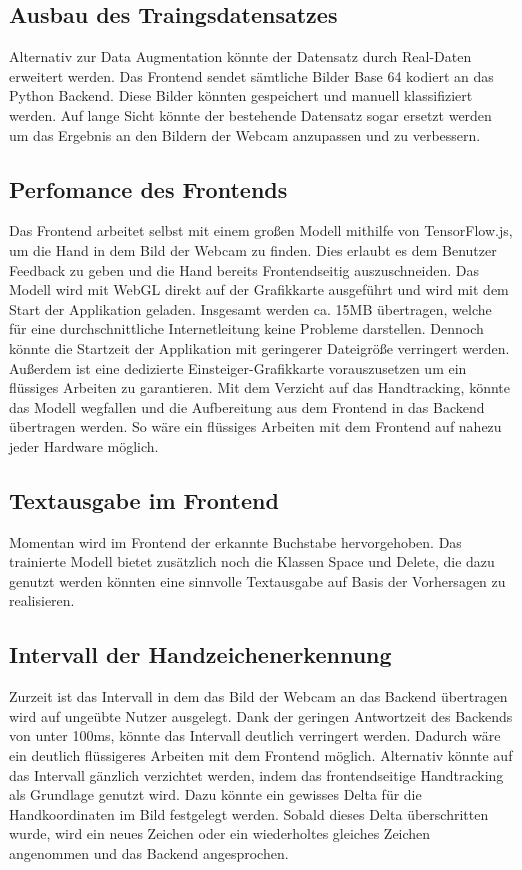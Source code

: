 \documentclass[11pt,bibliography=totocnumbered]{scrartcl}
\begin{document}
\subsection{Ausbau des Traingsdatensatzes}
Alternativ zur Data Augmentation könnte der Datensatz durch Real-Daten erweitert werden. Das Frontend sendet sämtliche Bilder Base 64 kodiert an das Python Backend. Diese Bilder könnten gespeichert und manuell klassifiziert werden. Auf lange Sicht könnte der bestehende Datensatz sogar ersetzt werden um das Ergebnis an den Bildern der Webcam anzupassen und zu verbessern.
\subsection{Perfomance des Frontends}
Das Frontend arbeitet selbst mit einem großen Modell mithilfe von TensorFlow.js, um die Hand in dem Bild der Webcam zu finden. Dies erlaubt es dem Benutzer Feedback zu geben und die Hand bereits Frontendseitig auszuschneiden. Das Modell wird mit WebGL direkt auf der Grafikkarte ausgeführt und wird mit dem Start der Applikation geladen. Insgesamt werden ca. 15MB übertragen, welche für eine durchschnittliche Internetleitung keine Probleme darstellen. Dennoch könnte die Startzeit der Applikation mit geringerer Dateigröße verringert werden. Außerdem ist eine dedizierte Einsteiger-Grafikkarte vorauszusetzen um ein flüssiges Arbeiten zu garantieren. Mit dem Verzicht auf das Handtracking, könnte das Modell wegfallen und die Aufbereitung aus dem Frontend in das Backend übertragen werden. So wäre ein flüssiges Arbeiten mit dem Frontend auf nahezu jeder Hardware möglich.
\subsection{Textausgabe im Frontend}
Momentan wird im Frontend der erkannte Buchstabe hervorgehoben. Das trainierte Modell bietet zusätzlich noch die Klassen Space und Delete, die dazu genutzt werden könnten eine sinnvolle Textausgabe auf Basis der Vorhersagen zu realisieren. 
\subsection{Intervall der Handzeichenerkennung}
Zurzeit ist das Intervall in dem das Bild der Webcam an das Backend übertragen wird auf ungeübte Nutzer ausgelegt. Dank der geringen Antwortzeit des Backends von unter 100ms, könnte das Intervall deutlich verringert werden. Dadurch wäre ein deutlich flüssigeres Arbeiten mit dem Frontend möglich. Alternativ könnte auf das Intervall gänzlich verzichtet werden, indem das frontendseitige Handtracking als Grundlage genutzt wird. Dazu könnte ein gewisses Delta für die Handkoordinaten im Bild festgelegt werden. Sobald dieses Delta überschritten wurde, wird ein neues Zeichen oder ein wiederholtes gleiches Zeichen angenommen und das Backend angesprochen. 
\setcounter{biburllcpenalty}{7000}
\setcounter{biburlucpenalty}{8000}
\pagebreak
\printbibliography[title=Quellen]
\end{document}
